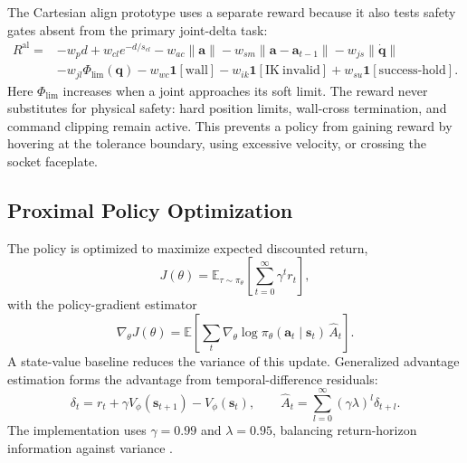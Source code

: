The Cartesian align prototype uses a separate reward because it also tests safety gates absent from the primary joint-delta task:
\begin{equation}
\begin{aligned}
R^{\text{al}}={}&-w_p d+w_{cl}e^{-d/s_{cl}}-w_{ac}\lVert\bm a\rVert-w_{sm}\lVert\bm a-\bm a_{t-1}\rVert-w_{js}\lVert\dot{\bm q}\rVert\\
&-w_{jl}\Phi_{\mathrm{lim}}(\bm q)-w_{wc}\mathbf1[\mathrm{wall}]-w_{ik}\mathbf1[\mathrm{IK\ invalid}]+w_{su}\mathbf1[\mathrm{success\!\!\!\!\text{-}hold}].
\end{aligned}
\label{rl:eq:rl-reward-align}
\end{equation}
Here $\Phi_{\mathrm{lim}}$ increases when a joint approaches its soft limit. The reward never substitutes for physical safety: hard position limits, wall-cross termination, and command clipping remain active. This prevents a policy from gaining reward by hovering at the tolerance boundary, using excessive velocity, or crossing the socket faceplate.

\rlFloatBarrier

\subsection{Proximal Policy Optimization}\label{rl:sec:rl-ppo}

The policy is optimized to maximize expected discounted return,
\begin{equation}
J(\theta)=\mathbb{E}_{\tau\sim\pi_\theta}\!\left[\sum_{t=0}^{\infty}\gamma^t r_t\right],
\label{rl:eq:rl-objective}
\end{equation}
with the policy-gradient estimator
\begin{equation}
\nabla_\theta J(\theta)=\mathbb{E}\!\left[\sum_t\nabla_\theta\log\pi_\theta(\bm a_t\mid\bm s_t)\,\hat A_t\right].
\label{rl:eq:rl-pg}
\end{equation}
A state-value baseline reduces the variance of this update. Generalized advantage estimation forms the advantage from temporal-difference residuals:
\begin{equation}
\delta_t=r_t+\gamma V_\phi(\bm{s}_{t+1})-V_\phi(\bm{s}_t),\qquad
\hat A_t=\sum_{l=0}^{\infty}(\gamma\lambda)^l\delta_{t+l}.
\label{rl:eq:rl-gae}
\end{equation}
The implementation uses $\gamma=0.99$ and $\lambda=0.95$, balancing return-horizon information against variance \cite{schulman_2016_gae}.

